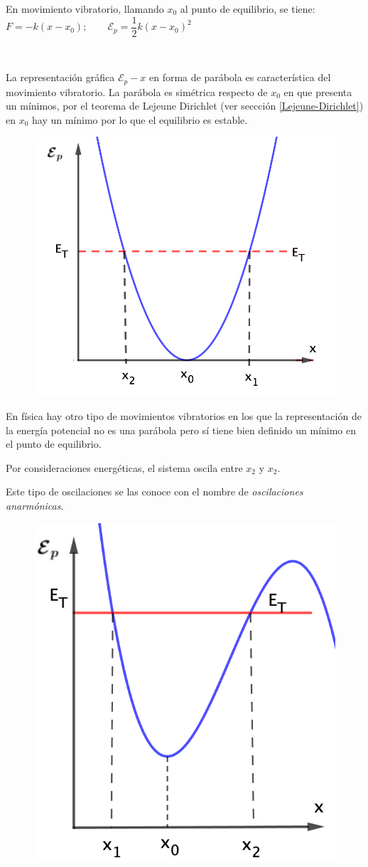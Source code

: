 En movimiento vibratorio, llamando $x_0$ al punto de equilibrio, se tiene:
$F=-k(x-x_0); \qquad \mathcal E_p=\dfrac 1 2 k (x-x_0)^2$

\begin{multicols}{2}
$\quad$ 

La representación gráfica $\mathcal E_p - x$ en forma de parábola es característica del movimiento vibratorio. La parábola es simétrica respecto de $x_0$ en que presenta un mínimos, por el teorema de Lejeune Dirichlet (ver seccción \ref{Lejeune-Dirichlet}) en $x_0$ hay un mínimo por lo que el equilibrio es estable.

\begin{figure}[H]
		\centering
		\includegraphics[width=.35\textwidth]{imagenes/imagenes20/T20IM01.png}
	\end{figure}
\end{multicols}

\begin{multicols}{2}
En física hay otro tipo de movimientos vibratorios en los que la representación de la energía potencial no es una parábola pero sí tiene bien definido un mínimo en el punto de equilibrio.

Por consideraciones energéticas, el sistema oscila entre $x_2$ y $x_2$.

Este tipo de oscilaciones se las conoce con el nombre de \emph{oscilaciones anarmónicas}.
\begin{figure}[H]
		\centering
		\includegraphics[width=.3\textwidth]{imagenes/imagenes20/T20IM02.png}
	\end{figure}
\end{multicols}

